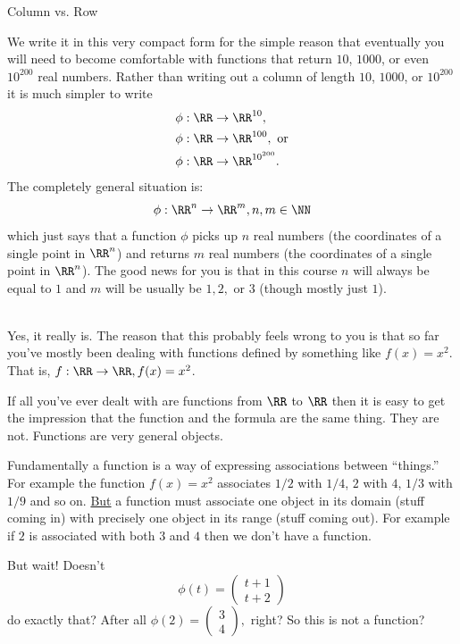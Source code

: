 \begin{mynotation}{Column vs. Row}
\begin{description}
    We write it in this very compact form for the simple reason that
    eventually you will need to become comfortable with functions that
    return $10$, $1000$, or even $10^{200}$ real numbers. Rather than
    writing out a column of length $10$, $1000$, or $10^{200}$ it is
    much simpler to write
    \begin{align*}
      \phi&:\RR\rightarrow\RR^{10},\\
      \phi&:\RR\rightarrow\RR^{100},\text{ or}\\
      \phi&:\RR\rightarrow\RR^{10^{200}}.
    \end{align*}
    The completely general situation is:
    $$
    \phi:\RR^n\rightarrow\RR^m, n,m \in \NN
    $$
    which just says that a function $\phi$ picks up $n$ real numbers
    (the coordinates of a single point in $\RR^n$) and returns $m$
    real numbers (the coordinates of a single point in $\RR^n$).  The
    good news for you is that in this course $n$ will always be equal
    to $1$ and $m$ will be usually be $1, 2,$ or $3$ (though mostly
    just $1$).
  \item[If $\phi:\RR\rightarrow\RR^2$ returns \emph{two} numbers is it
    \emph{really} a function?]
    \ \\
    Yes, it really is. The reason that this probably feels wrong to
    you is that so far you've mostly been dealing with functions
    defined by something like $f(x)=x^2$. That is,
    $f:\RR\rightarrow\RR, f(x)=x^2$.

    If all you've ever dealt with are functions from $\RR$ to $\RR$
    then it is easy to get the impression that the function and the
    formula are the same thing. They are not. Functions are very
    general objects.

    Fundamentally a function is a way of expressing associations
    between ``things.'' For example the function $f(x)=x^2$
    associates $1/2$ with $1/4$,  $2$ with $4$, $1/3$ with $1/9$ and
    so on. \underline{But} a function must associate one object in
    its domain (stuff coming in) with precisely one object in its
    range (stuff coming out). For example if $2$ is associated with
    both $3$ and $4$ then we don't have a function.

    But wait! Doesn't
    $$
    \phi(t)=
    \begin{pmatrix}
      t+1\\
      t+2
    \end{pmatrix}
    $$
    do  exactly that? After all $\phi(2) =
    \begin{pmatrix}
      3\\4
    \end{pmatrix},$ right? So this is \alert{not} a function?


\end{description}
\end{mynotation}

